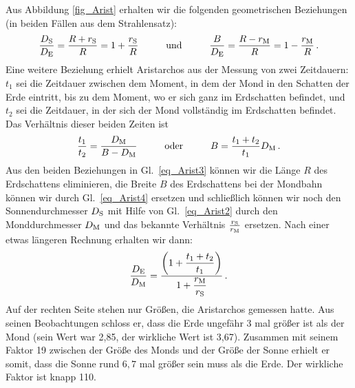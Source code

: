 Aus Abbildung \ref{fig_Arist} erhalten wir die folgenden geometrischen Beziehungen (in beiden F\"allen
aus dem Strahlensatz):
\begin{equation}
\label{eq_Arist3}
        \frac{D_{\rm S}}{D_{\rm E}} = \frac{R+r_{\rm S}}{R} =  1+\frac{r_{\rm S}}{R}  \hspace{1.0cm} {\rm und} \hspace{1cm}
        \frac{B}{D_{\rm E}} = \frac{R-r_{\rm M}}{R} =  1-\frac{r_{\rm M}}{R}  \, .
\end{equation}
Eine weitere Beziehung erhielt Aristarchos aus der Messung von zwei Zeitdauern: 
$t_1$ sei die Zeitdauer zwischen dem Moment, in dem der Mond in den Schatten der Erde eintritt, bis
zu dem Moment, wo er sich ganz im Erdschatten befindet, und $t_2$ sei die Zeitdauer, in der sich der Mond 
vollst\"andig im Erdschatten befindet. 
Das Verh\"altnis dieser beiden Zeiten ist
\begin{equation}
\label{eq_Arist4}
           \frac{t_1}{t_2} = \frac{D_{\rm M}}{B-D_{\rm M}}   \hspace{1.0cm} {\rm oder} \hspace{1.0cm}
             B= \frac{t_1+t_2}{t_1} D_{\rm M} \, .
\end{equation}
Aus den beiden Beziehungen in Gl.\ \ref{eq_Arist3} k\"onnen wir die L\"ange $R$ des Erdschattens eliminieren,
die Breite $B$ des Erdschattens bei der Mondbahn k\"onnen wir durch Gl.\ \ref{eq_Arist4} ersetzen und
schlie\ss lich k\"onnen wir noch den Sonnendurchmesser $D_{\rm S}$ mit Hilfe von Gl.\ \ref{eq_Arist2} 
durch den Monddurchmesser $D_{\rm M}$ und das bekannte Verh\"altnis $\frac{r_{\rm S}}{r_{\rm M}}$ ersetzen.
Nach einer etwas l\"angeren Rechnung erhalten wir dann:
\begin{equation}
\label{eq_Arist5}
             \frac{D_{\rm E}}{D_{\rm M}} 
             = \frac{\displaystyle \left( 1 + \frac{t_1+t_2}{t_1} \right)}{\displaystyle 1 + \frac{r_{\rm M}}{r_{\rm S}}} \, .
\end{equation}
Auf der rechten Seite stehen nur Gr\"o\ss en, die Aristarchos gemessen hatte. 
Aus seinen Beobachtungen schloss er,
dass die Erde ungef\"ahr 3 mal gr\"o\ss er ist als der Mond (sein Wert war 2,85, der wirkliche Wert
ist 3,67). Zusammen mit seinem Faktor 19 zwischen der Gr\"o\ss e des Monds und der
Gr\"o\ss e der Sonne erhielt er somit, dass die Sonne rund $6,7$ mal gr\"o\ss er sein muss als die
Erde. Der wirkliche Faktor ist knapp 110. 

